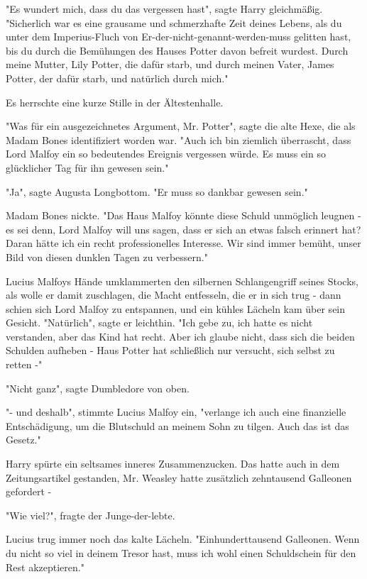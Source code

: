 {"Es wundert mich, dass du das vergessen hast", sagte Harry gleichmäßig. "Sicherlich war es eine grausame und schmerzhafte Zeit deines Lebens, als du unter dem Imperius-Fluch von Er-der-nicht-genannt-werden-muss gelitten hast, bis du durch die Bemühungen des Hauses Potter davon befreit wurdest. Durch meine Mutter, Lily Potter, die dafür starb, und durch meinen Vater, James Potter, der dafür starb, und natürlich durch mich."

Es herrschte eine kurze Stille in der Ältestenhalle.

"Was für ein ausgezeichnetes Argument, Mr. Potter", sagte die alte Hexe, die als Madam Bones identifiziert worden war. "Auch ich bin ziemlich überrascht, dass Lord Malfoy ein so bedeutendes Ereignis vergessen würde. Es muss ein so glücklicher Tag für ihn gewesen sein."

"Ja", sagte Augusta Longbottom. "Er muss so dankbar gewesen sein."

Madam Bones nickte. "Das Haus Malfoy könnte diese Schuld unmöglich leugnen - es sei denn, Lord Malfoy will uns sagen, dass er sich an etwas falsch erinnert hat? Daran hätte ich ein recht professionelles Interesse. Wir sind immer bemüht, unser Bild von diesen dunklen Tagen zu verbessern."

Lucius Malfoys Hände umklammerten den silbernen Schlangengriff seines Stocks, als wolle er damit zuschlagen, die Macht entfesseln, die er in sich trug - dann schien sich Lord Malfoy zu entspannen, und ein kühles Lächeln kam über sein Gesicht. "Natürlich", sagte er leichthin. "Ich gebe zu, ich hatte es nicht verstanden, aber das Kind hat recht. Aber ich glaube nicht, dass sich die beiden Schulden aufheben - Haus Potter hat schließlich nur versucht, sich selbst zu retten -"

"Nicht ganz", sagte Dumbledore von oben.

"- und deshalb", stimmte Lucius Malfoy ein, "verlange ich auch eine finanzielle Entschädigung, um die Blutschuld an meinem Sohn zu tilgen. Auch das ist das Gesetz."

Harry spürte ein seltsames inneres Zusammenzucken. Das hatte auch in dem Zeitungsartikel gestanden, Mr. Weasley hatte zusätzlich zehntausend Galleonen gefordert -

"Wie viel?", fragte der Junge-der-lebte.

Lucius trug immer noch das kalte Lächeln. "Einhunderttausend Galleonen. Wenn du nicht so viel in deinem Tresor hast, muss ich wohl einen Schuldschein für den Rest akzeptieren."

}
